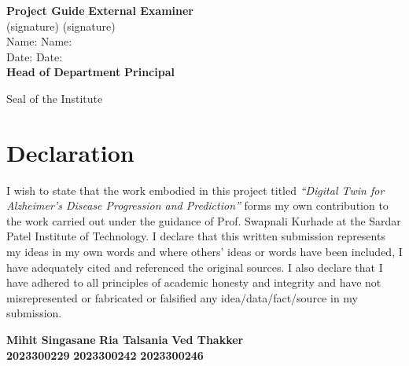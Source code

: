 \documentclass[12pt,singleside,a4paper]{article}
\begin{document}
\vspace{3cm}
\noindent
\textbf{Project Guide} \hspace{4cm} \textbf{External Examiner}\\[0.3cm]
(signature) \hspace{5.5cm} (signature)\\[0.3cm]
Name: \hspace{6.2cm} Name:\\[0.3cm]
Date: \hspace{6.4cm} Date:\\[2cm]
\textbf{Head of Department} \hspace{3cm} \textbf{Principal}\\[1.5cm]
\begin{center}
Seal of the Institute
\end{center}

\pagebreak
\section*{\centering Declaration}
\vspace{2cm}
I wish to state that the work embodied in this project titled \textit{``Digital Twin for Alzheimer's Disease Progression and Prediction''} forms my own contribution to the work carried out under the guidance of Prof. Swapnali Kurhade at the Sardar Patel Institute of Technology. I declare that this written submission represents my ideas in my own words and where others' ideas or words have been included, I have adequately cited and referenced the original sources. I also declare that I have adhered to all principles of academic honesty and integrity and have not misrepresented or fabricated or falsified any idea/data/fact/source in my submission.

\vspace{2cm}
\noindent
\textbf{Mihit Singasane} \hspace{2.5cm} \textbf{Ria Talsania} \hspace{2.5cm} \textbf{Ved Thakker}\\[1.5cm]
\textbf{2023300229} \hspace{3.5cm} \textbf{2023300242} \hspace{2.5cm} \textbf{2023300246}

\pagebreak
\end{document}
